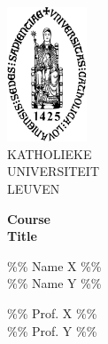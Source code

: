 \begin{titlepage}
\begin{flushleft}
\includegraphics[height=40mm]{figs/sedes_2.jpg}\\
\small
KATHOLIEKE\\ UNIVERSITEIT\\ LEUVEN
\end{flushleft}


\begin{center}
\textbf{Course} \\
\LARGE
\textbf{Title}
\end{center}


\begin{flushleft}
\small
\%\% Name X \%\% \\
\%\% Name Y \%\%
\end{flushleft}

\begin{flushleft}
\%\% Prof. X \%\% \\
\%\% Prof. Y \%\%
\end{flushleft}
\end{titlepage}